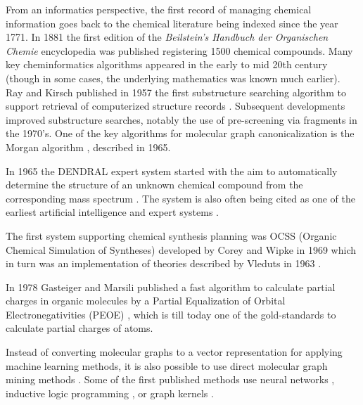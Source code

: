 \documentclass{sig-alternate}
\begin{document}
From an informatics perspective, the first record of managing chemical
information goes back to the chemical literature being indexed since
the year 1771.  In 1881 the first edition of the \textit{Beilstein's
  Handbuch der Organischen Chemie} encyclopedia was published
\cite{polanski2009} registering 1500 chemical compounds.  Many key
cheminformatics algorithms appeared in the early to mid 20th century
(though in some cases, the underlying mathematics was known much
earlier). Ray and Kirsch published in 1957 the first substructure
searching algorithm to support retrieval of computerized structure
records \cite{RayKirsch1957}. Subsequent developments improved
substructure searches, notably the use of pre-screening via fragments
\cite{Adamson:1973fk,Feldman:1975uq} in the 1970's. One of the key
algorithms for molecular graph canonicalization is the Morgan
algorithm \cite{Morgan1965}, described in 1965.

In 1965 the DENDRAL expert system started with the aim to
automatically determine the structure of an unknown chemical compound
from the corresponding mass spectrum \cite{Gray1986}. The system is
also often being cited as one of the earliest artificial intelligence
and expert systems \cite{Chen2006}.

The first system supporting chemical synthesis planning was OCSS
(Organic Chemical Simulation of Syntheses) developed by Corey and
Wipke in 1969 \cite{CoreyWipke1969} which in turn was an
implementation of theories described by Vleduts in 1963
\cite{Vleduts:1963kx}.

In 1978 Gasteiger and Marsili published a fast algorithm to calculate
partial charges in organic molecules by a Partial Equalization of
Orbital Electronegativities (PEOE) \cite{gm78}, which is till today
one of the gold-standards to calculate partial charges of atoms.

Instead of converting molecular graphs to a vector representation for
applying machine learning methods, it is also possible to use direct
molecular graph mining methods \cite{okada2006}. Some of the first
published methods use neural networks \cite{kireev1995}, inductive
logic programming \cite{yh02a}, or graph kernels \cite{kti03}.

 
\end{document}
